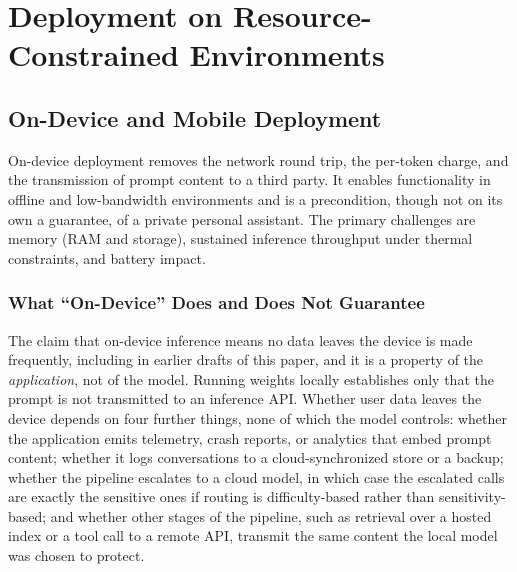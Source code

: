 
\section{Deployment on Resource-Constrained Environments}
\label{sec:deployment}

\subsection{On-Device and Mobile Deployment}
\label{subsec:deployment_mobile}

On-device deployment removes the network round trip, the per-token charge, and the transmission of prompt content to a third party. It enables functionality in offline and low-bandwidth environments and is a precondition, though not on its own a guarantee, of a private personal assistant. The primary challenges are memory (RAM and storage), sustained inference throughput under thermal constraints, and battery impact.

\subsubsection{What ``On-Device'' Does and Does Not Guarantee}
\label{subsec:deployment_privacy_scope}

The claim that on-device inference means no data leaves the device is made
frequently, including in earlier drafts of this paper, and it is a property of
the \emph{application}, not of the model. Running weights locally establishes
only that the prompt is not transmitted to an inference API. Whether user data
leaves the device depends on four further things, none of which the model
controls: whether the application emits telemetry, crash reports, or analytics
that embed prompt content; whether it logs conversations to a cloud-synchronized
store or a backup; whether the pipeline escalates to a cloud model, in which case
the escalated calls are exactly the sensitive ones if routing is difficulty-based
rather than sensitivity-based; and whether other stages of the pipeline, such as
retrieval over a hosted index or a tool call to a remote API, transmit the same
content the local model was chosen to protect.

